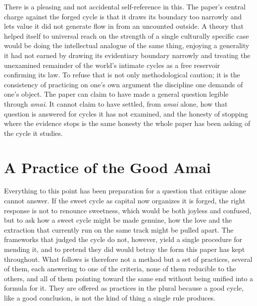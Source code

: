 \documentclass[11pt,a4paper]{article}
\begin{document}
There is a pleasing and not accidental self-reference in this. The paper's central charge against the forged cycle is that it draws its boundary too narrowly and lets value it did not generate flow in from an uncounted outside. A theory that helped itself to universal reach on the strength of a single culturally specific case would be doing the intellectual analogue of the same thing, enjoying a generality it had not earned by drawing its evidentiary boundary narrowly and treating the unexamined remainder of the world's intimate cycles as a free reservoir confirming its law. To refuse that is not only methodological caution; it is the consistency of practicing on one's own argument the discipline one demands of one's object. The paper can claim to have made a general question legible through \textit{amai}. It cannot claim to have settled, from \textit{amai} alone, how that question is answered for cycles it has not examined, and the honesty of stopping where the evidence stops is the same honesty the whole paper has been asking of the cycle it studies.

\section{A Practice of the Good Amai}

Everything to this point has been preparation for a question that critique alone cannot answer. If the sweet cycle as capital now organizes it is forged, the right response is not to renounce sweetness, which would be both joyless and confused, but to ask how a sweet cycle might be made genuine, how the love and the extraction that currently run on the same track might be pulled apart. The frameworks that judged the cycle do not, however, yield a single procedure for mending it, and to pretend they did would betray the form this paper has kept throughout. What follows is therefore not a method but a set of practices, several of them, each answering to one of the criteria, none of them reducible to the others, and all of them pointing toward the same end without being unified into a formula for it. They are offered as practices in the plural because a good cycle, like a good conclusion, is not the kind of thing a single rule produces.
\end{document}
